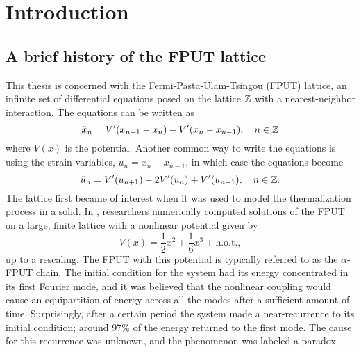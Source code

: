 
\chapter{Introduction}

\section{A brief history of the FPUT lattice}

This thesis is concerned with the Fermi-Pasta-Ulam-Tsingou (FPUT) lattice, an infinite set of differential equations posed on the lattice \(\mathbb{Z}\) with a nearest-neighbor interaction. The equations can be written as
\begin{equation}\label{fput-lattice-odes}
	\ddot x_n = V'(x_{n+1}- x_n) - V'(x_n - x_{n-1}), \quad n\in \mathbb{Z}
\end{equation}
where \(V(x)\) is the potential. Another common way to write the equations is using the strain variables, \(u_n = x_ n - x_{n-1}\), in which case the equations become
\begin{equation}\label{fput-lattice-equations-strain-variables}
	\ddot{u}_n = V'(u_{n+1}) - 2 V'(u_n) + V'(u_{n-1}), \quad n \in \mathbb{Z}.
\end{equation}
The lattice first became of interest when it was used to model the thermalization process in a solid. In \cite{fermi1955studies}, researchers numerically computed solutions of the FPUT on a large, finite lattice with a nonlinear potential given by
\begin{equation*}
	V(x) = \frac 1 2 x^2 + \frac 1 6 x^3 + \text{h.o.t.},
\end{equation*}
up to a rescaling. The FPUT with this potential is typically referred to as the \(\alpha\)-FPUT chain. The initial condition for the system had its energy concentrated in its first Fourier mode, and it was believed that the nonlinear coupling would cause an equipartition of energy across all the modes after a sufficient amount of time. Surprisingly, after a certain period the system made a near-recurrence to its initial condition; around 97\% of the energy returned to the first mode. The cause for this recurrence was unknown, and the phenomenon was labeled a paradox. 

